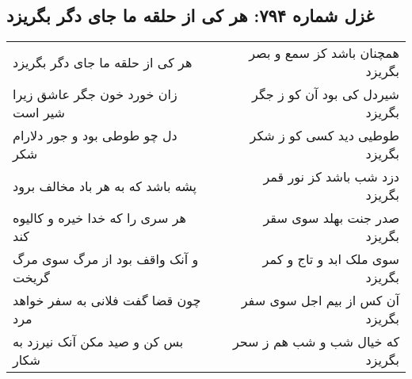 \begin{center}
\section*{غزل شماره ۷۹۴: هر کی از حلقه ما جای دگر بگریزد}
\label{sec:0794}
\begin{longtable}{l p{0.5cm} r}
هر کی از حلقه ما جای دگر بگریزد
&&
همچنان باشد کز سمع و بصر بگریزد
\\
زان خورد خون جگر عاشق زیرا شیر است
&&
شیردل کی بود آن کو ز جگر بگریزد
\\
دل چو طوطی بود و جور دلارام شکر
&&
طوطیی دید کسی کو ز شکر بگریزد
\\
پشه باشد که به هر باد مخالف برود
&&
دزد شب باشد کز نور قمر بگریزد
\\
هر سری را که خدا خیره و کالیوه کند
&&
صدر جنت بهلد سوی سقر بگریزد
\\
و آنک واقف بود از مرگ سوی مرگ گریخت
&&
سوی ملک ابد و تاج و کمر بگریزد
\\
چون قضا گفت فلانی به سفر خواهد مرد
&&
آن کس از بیم اجل سوی سفر بگریزد
\\
بس کن و صید مکن آنک نیرزد به شکار
&&
که خیال شب و شب هم ز سحر بگریزد
\\
\end{longtable}
\end{center}
